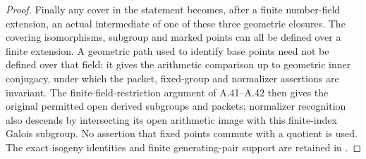 \begin{proof}
Finally any cover in the statement becomes, after a finite
number-field extension, an actual intermediate of one of these
three geometric closures. The covering isomorphisms, subgroup
and marked points can all be defined over a finite extension.
A geometric path used to identify base points need not be
defined over that field: it gives the arithmetic comparison up
to geometric inner conjugacy, under which the packet, fixed-group
and normalizer assertions are invariant.
The finite-field-restriction argument of A.41--A.42
then gives the original permitted open derived subgroups and
packets; normalizer recognition also descends by intersecting
its open arithmetic image with this finite-index Galois subgroup.
No assertion that fixed points commute with a quotient is used.
The exact isogeny identities and finite generating-pair support
are retained in .
\end{proof}
